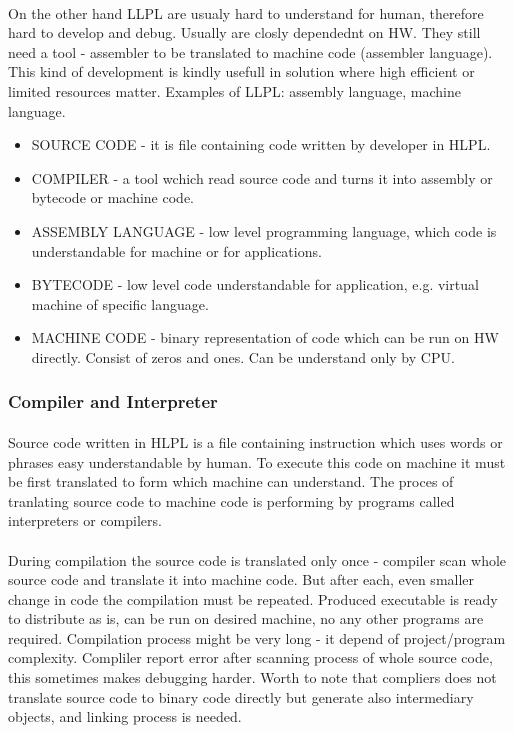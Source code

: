 \documentclass{article}
\begin{document}
	\paragraph{}
	On the other hand LLPL are usualy hard to understand for human, therefore hard to develop and debug. Usually are closly dependednt on HW. They still need a tool - assembler to be translated to machine code (assembler language). This kind of development is kindly usefull in solution where high efficient or limited resources matter. Examples of LLPL: assembly language, machine language.
	\begin{itemize}
	\item SOURCE CODE - it is file containing code written by developer in HLPL.
	\item COMPILER - a tool wchich read source code and turns it into assembly or bytecode or machine code.
	\item ASSEMBLY LANGUAGE - low level programming language, which code is understandable for machine or for applications.
	\item BYTECODE - low level code understandable for application, e.g. virtual machine of specific language.
	\item MACHINE CODE - binary representation of code which can be run on HW directly. Consist of zeros and ones. Can be understand only by CPU.
	\end{itemize}
	\subsubsection{Compiler and Interpreter}
	\paragraph{}
	Source code written in HLPL is a file containing instruction which uses words or phrases easy understandable by human. To execute this code on machine it must be first translated to form which machine can understand. The proces of tranlating source code to machine code is performing by programs called interpreters or compilers.
	\paragraph{}
	During compilation the source code is translated only once - compiler scan whole source code and translate it into machine code. But after each, even smaller change in code the compilation must be repeated. Produced executable is ready to distribute as is, can be run on desired machine, no any other programs are required. Compilation process might be very long - it depend of project/program complexity. Compliler report error after scanning process of whole source code, this sometimes makes debugging harder. Worth to note that compliers does not translate source code to binary code directly but generate also intermediary objects, and linking process is needed.
\end{document}
